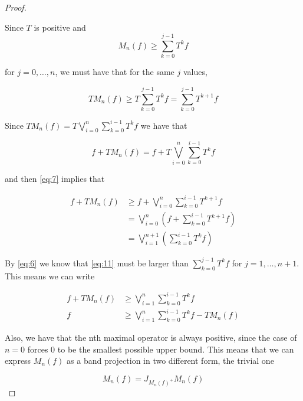 \documentclass[letterpaper,10pt,oneside,onecolumn,reqno]{amsart}
\theoremstyle{definition}
\begin{document}
\begin{proof}\label{prf:max-erg}

  Since $T$ is positive and
  \begin{equation}
    \label{eq:6}
    M_n(f) \geq \sum\limits_{k=0}^{j-1} T^k f
  \end{equation}

  for $j = 0,\dots,n$, we must have that for the same $j$ values,

  \begin{equation}
    \label{eq:7}
    TM_n(f) \geq T\sum\limits_{k=0}^{j-1} T^k f = \sum\limits_{k=0}^{j-1} T^{k+1}f
  \end{equation}

  Since $TM_n(f) = T\bigvee_{i=0}^n\sum\limits_{k=0}^{i-1} T^k f$ we
  have that

  \begin{equation}
    \label{eq:8}
    f + TM_n(f) = f + T\bigvee_{i=0}^n\sum\limits_{k=0}^{i-1} T^k f 
  \end{equation}

  and then \eqref{eq:7} implies that

  \begin{align}
    \label{eq:9}
    f + TM_n(f) &\geq f + \bigvee_{i=0}^n\sum\limits_{k=0}^{i-1} T^{k+1}f  \\
    \label{eq:10}
    &= \bigvee_{i=0}^n( f + \sum\limits_{k=0}^{i-1} T^{k+1}f)  \\
    \label{eq:11}
    &= \bigvee_{i=1}^{n+1}( \sum\limits_{k=0}^{i-1} T^{k}f)
  \end{align}

  By \eqref{eq:6} we know that \eqref{eq:11} must be larger than
  $\sum\limits_{k=0}^{j-1} T^{k}f$ for $j = 1,\dots,n+1$. This means
  we can write

  \begin{align}
    \label{eq:12}
    f + TM_n(f) &\geq \bigvee_{i=1}^{n}\sum\limits_{k=0}^{i-1} T^{k}f  \\
    \label{eq:13}
    f &\geq \bigvee_{i=1}^{n}\sum\limits_{k=0}^{i-1} T^{k}f - TM_n(f)
  \end{align}


  Also, we have that the nth maximal operator is always positive,
  since the case of $n=0$ forces $0$ to be the smallest possible upper
  bound. This means that we can express $M_n(f)$ as a band projection
  in two different form, the trivial one

  \begin{equation}
    \label{eq:14}
    M_n(f) = J_{M_n{(f)}^+}M_n(f) 
  \end{equation}


\end{proof}
\end{document}
